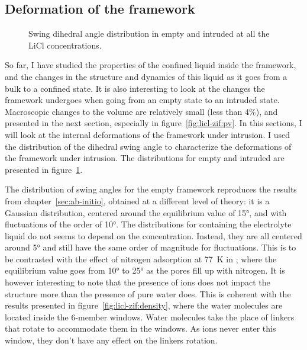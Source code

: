 \documentclass[thesis]{subfiles}
\begin{document}
\subsection{Deformation of the framework}
\label{sec:licl-zifdeformation}

\begin{figure}[ht]
    \centering
    
    \caption{Swing dihedral angle distribution in empty and intruded  at
    all the LiCl concentrations.}
    \label{fig:licl-zif:dihedrals}
\end{figure}

So far, I have studied the properties of the confined liquid inside the 
framework, and the changes in the structure and dynamics of this liquid as it
goes from a bulk to a confined state. It is also interesting to look at the
changes the framework undergoes when going from an empty state to an intruded
state. Macroscopic changes to the volume are relatively small (less than 4\%),
and presented in the next section, especially in figure~\ref{fig:licl-zif:pv}.
In this sections, I will look at the internal deformations of the framework
under intrusion. I used the distribution of the  dihedral swing
angle to characterize the deformations of the framework under intrusion. The
distributions for empty and intruded  are presented in
figure~\ref{fig:licl-zif:dihedrals}.

The distribution of swing angles for the empty framework reproduces the results
from chapter~\ref{sec:ab-initio}, obtained at a different level of theory: it is
a Gaussian distribution, centered around the equilibrium value of 15°, and with
fluctuations of the order of 10°. The distributions for  containing the
electrolyte liquid do not seems to depend on the concentration.  Instead, they
are all centered around 5° and still have the same order of magnitude for
fluctuations. This is to be contrasted with the effect of nitrogen adsorption at
\SI{77}{K} in ; where the equilibrium value goes from 10° to 25° as the
pores fill up with nitrogen. It is however interesting to note that the presence
of ions does not impact the structure more than the presence of pure water does.
This is coherent with the results presented in
figure~\ref{fig:licl-zif:density}, where the water molecules are located inside
the 6-member windows. Water molecules take the place of linkers that rotate to
accommodate them in the windows. As ions never enter this window, they don't
have any effect on the linkers rotation.
\end{document}

